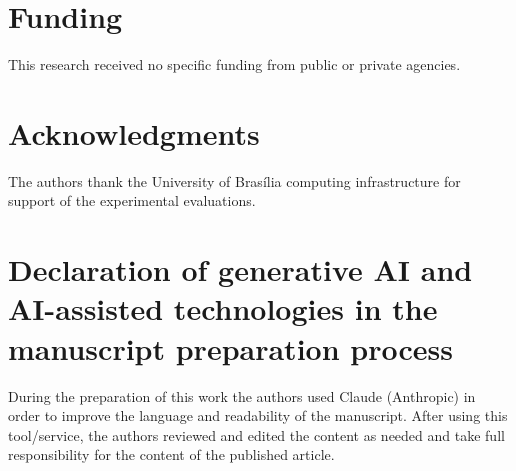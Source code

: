 \documentclass[a4paper,fleqn]{cas-dc}
\begin{document}
\section*{Funding}
This research received no specific funding from public or private agencies.
\section*{Acknowledgments}
The authors thank the University of Bras\'ilia computing infrastructure
for support of the experimental evaluations.
\begin{sloppypar}
\section*{Declaration of generative AI and AI-assisted technologies in the
manuscript preparation process}
{\color{\revcolor}During the preparation of this work the authors used Claude
(Anthropic) in order to improve the language and readability of the
manuscript. After using this tool/service, the authors reviewed and edited
the content as needed and take full responsibility for the content of the
published article.}
\end{sloppypar}


\end{document}

